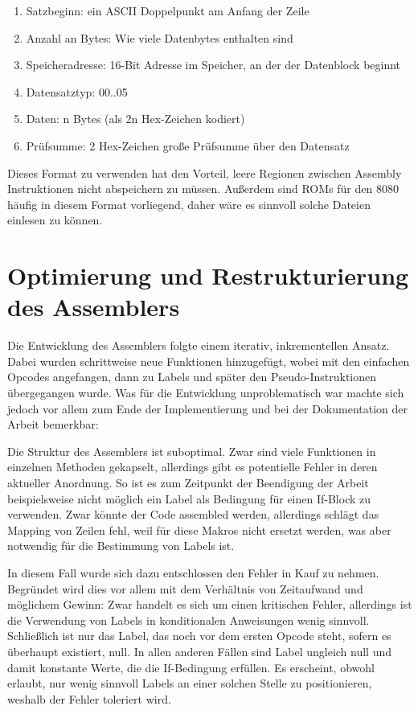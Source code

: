 \begin{enumerate}
\item Satzbeginn: ein ASCII Doppelpunkt am Anfang der Zeile
\item Anzahl an Bytes: Wie viele Datenbytes enthalten sind
\item Speicheradresse: 16-Bit Adresse im Speicher, an der der Datenblock beginnt
\item Datensatztyp: 00..05
\item Daten: n Bytes (als 2n Hex-Zeichen kodiert)
\item Prüfsumme: 2 Hex-Zeichen große Prüfsumme über den Datensatz
\end{enumerate}

Dieses Format zu verwenden hat den Vorteil, leere Regionen zwischen Assembly Instruktionen nicht abspeichern zu müssen. Außerdem sind ROMs für den 8080 häufig in diesem Format vorliegend, daher wäre es sinnvoll solche Dateien einlesen zu können.

\section{Optimierung und Restrukturierung des Assemblers}

Die Entwicklung des Assemblers folgte einem iterativ, inkrementellen Ansatz. Dabei wurden schrittweise neue Funktionen hinzugefügt, wobei mit den einfachen Opcodes angefangen, dann zu Labels und später den Pseudo-Instruktionen übergegangen wurde. Was für die Entwicklung unproblematisch war machte sich jedoch vor allem zum Ende der Implementierung und bei der Dokumentation der Arbeit bemerkbar:

Die Struktur des Assemblers ist suboptimal. Zwar sind viele Funktionen in einzelnen Methoden gekapselt, allerdings gibt es potentielle Fehler in deren aktueller Anordnung. So ist es zum Zeitpunkt der Beendigung der Arbeit beispielsweise nicht möglich ein Label als Bedingung für einen If-Block zu verwenden. Zwar könnte der Code assembled werden, allerdings schlägt das Mapping von Zeilen fehl, weil für diese Makros nicht ersetzt werden, was aber notwendig für die Bestimmung von Labels ist.

In diesem Fall wurde sich dazu entschlossen den Fehler in Kauf zu nehmen. Begründet wird dies vor allem mit dem Verhältnis von Zeitaufwand und möglichem Gewinn: Zwar handelt es sich um einen kritischen Fehler, allerdings ist die Verwendung von Labels in konditionalen Anweisungen wenig sinnvoll. Schließlich ist nur das Label, das noch vor dem ersten Opcode steht, sofern es überhaupt existiert, null. In allen anderen Fällen sind Label ungleich null und damit konstante Werte, die die If-Bedingung erfüllen. Es erscheint, obwohl erlaubt, nur wenig sinnvoll Labels an einer solchen Stelle zu positionieren, weshalb der Fehler toleriert wird.

